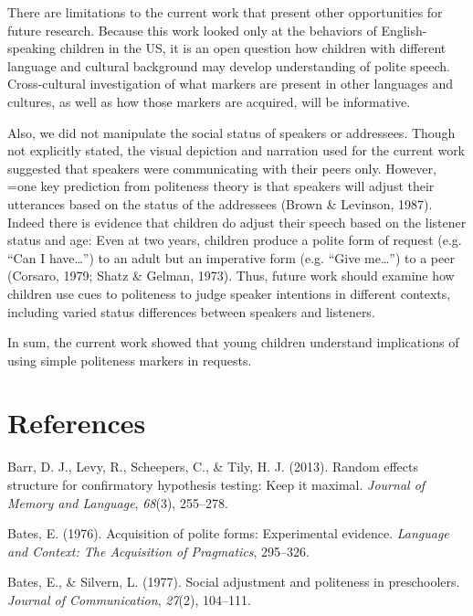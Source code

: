 \documentclass[10pt, letterpaper]{article}
\begin{document}
There are limitations to the current work that present other
opportunities for future research. Because this work looked only at the
behaviors of English-speaking children in the US, it is an open question
how children with different language and cultural background may develop
understanding of polite speech. Cross-cultural investigation of what
markers are present in other languages and cultures, as well as how
those markers are acquired, will be informative.

Also, we did not manipulate the social status of speakers or addressees.
Though not explicitly stated, the visual depiction and narration used
for the current work suggested that speakers were communicating with
their peers only. However, =one key prediction from politeness theory is
that speakers will adjust their utterances based on the status of the
addressees (Brown \& Levinson, 1987). Indeed there is evidence that
children do adjust their speech based on the listener status and age:
Even at two years, children produce a polite form of request (e.g. ``Can
I have\ldots{}'') to an adult but an imperative form (e.g. ``Give
me\ldots{}'') to a peer (Corsaro, 1979; Shatz \& Gelman, 1973). Thus,
future work should examine how children use cues to politeness to judge
speaker intentions in different contexts, including varied status
differences between speakers and listeners.

In sum, the current work showed that young children understand
implications of using simple politeness markers in requests.

\section{References}\label{references}

\setlength{\parindent}{-0.1in} \setlength{\leftskip}{0.125in} \noindent

\hypertarget{refs}{}
\hypertarget{ref-barr2013}{}
Barr, D. J., Levy, R., Scheepers, C., \& Tily, H. J. (2013). Random
effects structure for confirmatory hypothesis testing: Keep it maximal.
\emph{Journal of Memory and Language}, \emph{68}(3), 255--278.

\hypertarget{ref-bates1976}{}
Bates, E. (1976). Acquisition of polite forms: Experimental evidence.
\emph{Language and Context: The Acquisition of Pragmatics}, 295--326.

\hypertarget{ref-bates1977}{}
Bates, E., \& Silvern, L. (1977). Social adjustment and politeness in
preschoolers. \emph{Journal of Communication}, \emph{27}(2), 104--111.
\end{document}
